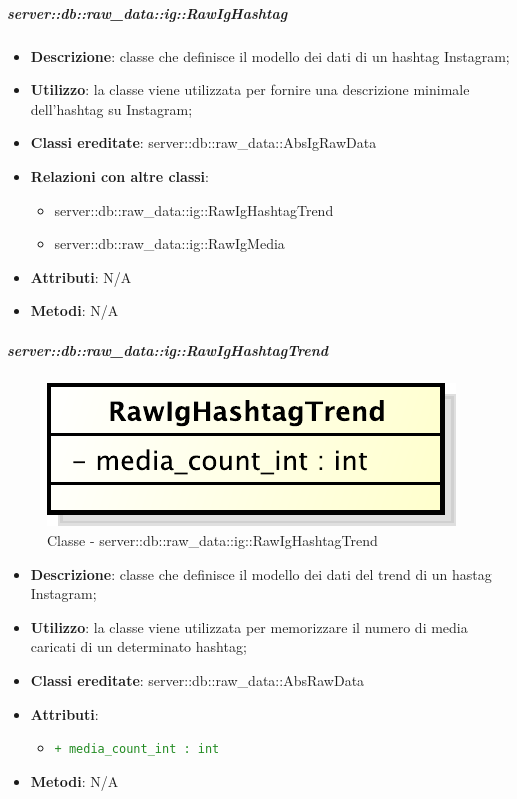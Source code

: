 		\subparagraph{server::db::raw\_data::ig::RawIgHashtag} %
		\label{subp:server_db_raw_data_ig_rawighashtag}
			\begin{itemize}
				\item \textbf{Descrizione}: classe che definisce il modello dei dati di un hashtag Instagram;
				\item \textbf{Utilizzo}: la classe viene utilizzata per fornire una descrizione minimale dell'hashtag su Instagram;
				\item \textbf{Classi ereditate}: server::db::raw\_data::AbsIgRawData
				\item \textbf{Relazioni con altre classi}:
					\begin{itemize}
						\item server::db::raw\_data::ig::RawIgHashtagTrend
						\item server::db::raw\_data::ig::RawIgMedia
					\end{itemize}
				\item \textbf{Attributi}: N/A
				\item \textbf{Metodi}: N/A
			\end{itemize}


		\subparagraph{server::db::raw\_data::ig::RawIgHashtagTrend} %
		\label{subp:server_db_raw_data_ig_rawighashtagtrend}
			\begin{figure}[htbp]
				\centering
				\centerline{\includegraphics[scale=0.75]{./images/server/classes/db/raw_ig_hashtag_trend.pdf}}
				\caption{Classe - server::db::raw\_data::ig::RawIgHashtagTrend}
			\end{figure}
			\begin{itemize}
				\item \textbf{Descrizione}: classe che definisce il modello dei dati del trend di un hastag Instagram;
				\item \textbf{Utilizzo}: la classe viene utilizzata per memorizzare il numero di media caricati di un determinato hashtag;
				\item \textbf{Classi ereditate}: server::db::raw\_data::AbsRawData
				\item \textbf{Attributi}:
					\begin{itemize}
						\item \textcolor{forestgreen}{\texttt{+ media\_count\_int : int}}
					\end{itemize}
				\item \textbf{Metodi}: N/A
			\end{itemize}


